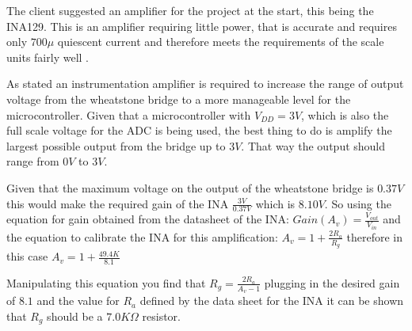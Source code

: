 

The client suggested an amplifier for the project at the start, this being the INA129. This is an amplifier requiring little power, that is accurate and requires only $700\mu$ quiescent current \cite{ina} and therefore meets the requirements of the scale units fairly well .

As stated an instrumentation amplifier is required to increase the range of output voltage from the wheatstone bridge to a more manageable level for the microcontroller. Given that a microcontroller with $V_{DD} = 3\unit{V}$, which is also the full scale voltage for the ADC is being used, the best thing to do is amplify the largest possible output from the bridge up to $3\unit{V}$. That way the output should range from $0\unit{V}$ to $3\unit{V}$. 

Given that the maximum voltage on the output of the wheatstone bridge is $0.37V$ this would make the required gain of the INA $\frac{3V}{0.37V}$ which is $8.10V$. So using the equation for gain obtained from the datasheet of the INA: \(Gain(A_{v}) = \frac{V_{out}}{V_{in}}\) and the equation to calibrate the INA for this amplification: 
$A_v = 1 + \frac{2R_a}{R_g}$ therefore in this case $A_v = 1 + \frac{49.4K}{8.1}$

Manipulating this equation you find that $R_g = \frac{2R_a}{A_v - 1}$ plugging in the desired gain of $8.1$ and the value for $R_a$ defined by the data sheet for the INA it can be shown that $R_g$ should be a $7.0\unit{K\Omega}$ resistor. 
